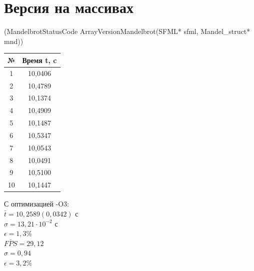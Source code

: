 \documentclass[12pt, letterpaper]{article}
\begin{document}
    \newpage
    \section{Версия на массивах} (MandelbrotStatusCode ArrayVersionMandelbrot(SFML* sfml, Mandel\_struct* mnd))

    \begin{table}
        \begin{tabular}{cc}
        \toprule             %
        \textbf{№} & \textbf{Время t, c} \\
        \midrule             %
        1 & 10,0406 \\
        2 & 10,4789 \\
        3 & 10,1374 \\
        4 & 10,4909 \\
        5 & 10,1487 \\
        6 & 10,5347 \\
        7 & 10,0543 \\
        8 & 10,0491 \\
        9 & 10,5100 \\
        10 & 10,1447 \\
        \bottomrule          %
        \end{tabular}
    \end{table}

     С оптимизацией -O3:\\

    $\bar{t} = 10,2589 (0,0342)$ с\\

    $\sigma = 13,21 \cdot 10^{-2}$ с\\

    $\epsilon = 1,3\%$\\

    $\bar{FPS} = 29,12$\\

    $\sigma = 0,94$\\

    $\epsilon = 3,2\%$\\
\end{document}

